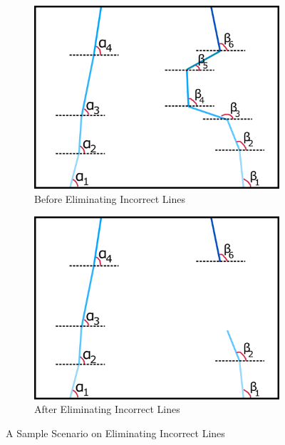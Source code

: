 \documentclass[a4paper,12pt]{article}
\begin{document}
\begin{enumerate}
\begin{figure}[H]
	\setlength{\unitlength}{\textwidth} 
	\centering
	\begin{subfigure}{.46\textwidth}
		\centering
		\includegraphics[width=0.44\unitlength]{images/dataP_explained1}
		\caption{\label{fig:dataP_explained1} Before Eliminating Incorrect Lines}
	\end{subfigure}%
	\begin{subfigure}{.46\textwidth}
		\centering
		\includegraphics[width=0.44\unitlength]{images/dataP_explained2}
		\caption{\label{fig:dataP_explained2} After Eliminating Incorrect Lines}
	\end{subfigure}
	\caption{\label{fig:dataP_explained} A Sample Scenario on Eliminating Incorrect Lines}

\end{figure}
\end{enumerate}
\end{document}
